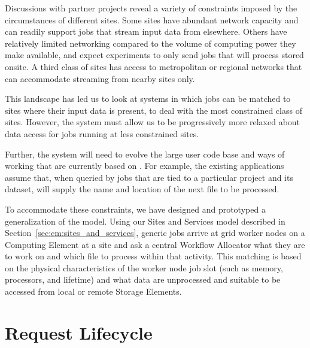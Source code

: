\documentclass[../main-v1.tex]{subfiles}
\begin{document}
Discussions with partner projects reveal a variety of constraints imposed by the circumstances of different sites. Some sites have 
abundant network capacity and can readily support jobs that stream input data from elsewhere. Others have relatively limited networking
compared to the volume of computing power they make available, and
expect experiments to only send jobs that will process %
stored onsite. A third class of sites has access to metropolitan or 
regional networks that can accommodate streaming from nearby sites only.

This landscape has led us to look at %
systems in which jobs can be matched to sites where their input data is present, to deal with the most constrained class of sites. %
However, the system must allow us to be progressively more relaxed about data access for jobs running at %
less constrained sites. %
 

Further, the system will need to evolve the large user code base and ways of working that are currently based on . For example, the %
existing applications assume that, when queried by jobs that are tied to a particular  project and its dataset,  will supply the name and location of the next file to be processed. 

To accommodate %
these constraints, we have designed and prototyped a generalization of the  model. Using our Sites and Services model described in Section~\ref{sec:cm:sites_and_services}, generic jobs arrive at grid worker nodes on a Computing Element at a site and ask a central Workflow Allocator what they are to work on and which file to process within that activity. This matching is based on the physical characteristics of the worker node job slot (such as memory, processors, and lifetime) and what data are unprocessed and suitable to be accessed from local or remote Storage Elements. 


\section{Request Lifecycle}
\label{sec:flow:lifecycle}
\end{document}
